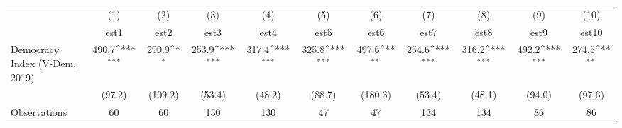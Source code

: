 {
\def\sym#1{\ifmmode^{#1}\else\(^{#1}\)\fi}
\begin{tabular}{l*{10}{c}}
                &\multicolumn{1}{c}{(1)}         &\multicolumn{1}{c}{(2)}         &\multicolumn{1}{c}{(3)}         &\multicolumn{1}{c}{(4)}         &\multicolumn{1}{c}{(5)}         &\multicolumn{1}{c}{(6)}         &\multicolumn{1}{c}{(7)}         &\multicolumn{1}{c}{(8)}         &\multicolumn{1}{c}{(9)}         &\multicolumn{1}{c}{(10)}         \\
                &     est1         &     est2         &     est3         &     est4         &     est5         &     est6         &     est7         &     est8         &     est9         &    est10         \\
Democracy Index (V-Dem, 2019)&    490.7\sym{***}&    290.9\sym{*}  &    253.9\sym{***}&    317.4\sym{***}&    325.8\sym{***}&    497.6\sym{**} &    254.6\sym{***}&    316.2\sym{***}&    492.2\sym{***}&    274.5\sym{**} \\
                &   (97.2)         &  (109.2)         &   (53.4)         &   (48.2)         &   (88.7)         &  (180.3)         &   (53.4)         &   (48.1)         &   (94.0)         &   (97.6)         \\
Observations    &       60         &       60         &      130         &      130         &       47         &       47         &      134         &      134         &       86         &       86         \\
\end{tabular}
}
